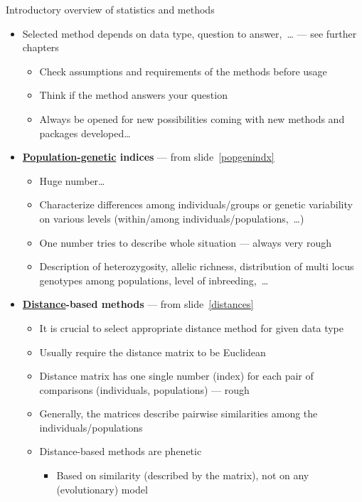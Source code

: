 \documentclass[compress, xelatex, 11pt, xcolor=svgnames, aspectratio=169,
	hyperref={
		bookmarks=true,
		unicode=true,
		colorlinks=true,
		pdftitle={Molecular data in R},
		plainpages=false,
		pdfauthor={Vojtech Zeisek},
		pdfsubject={Course about phylogeny and evolution in R},
		pdfcreator={XeLaTeX},
		pdfkeywords={R, evolution, phylogeny, molecular data},
		linkcolor=Crimson, %
		anchorcolor=Magenta, %
		citecolor=Magenta, %
		filecolor=Magenta, %
		menucolor=Magenta, %
		urlcolor=DodgerBlue, %
		},
	url={hyphens, lowtilde} %
	]{beamer}
\begin{document}
\begin{frame}[allowframebreaks]{Introductory overview of statistics and methods}
	\begin{itemize}
		\item \alert{Selected method depends on data type, question to answer,~\ldots}{ }--- see further chapters
		\begin{itemize}
			\item Check assumptions and requirements of the methods before usage
			\item Think if the method answers your question
			\item Always be opened for new possibilities coming with new methods and packages developed\ldots
		\end{itemize}
		\item \textbf{\href{https://en.wikipedia.org/wiki/Population_genetics}{Population-genetic} indices} --- from slide~\ref{popgenindx}
		\begin{itemize}
			\item Huge number\ldots
			\item Characterize differences among individuals/groups or genetic variability on various levels (within/among individuals/populations,~\ldots)
			\item One number tries to describe whole situation --- always very rough
			\item Description of heterozygosity, allelic richness, distribution of multi locus genotypes among populations, level of inbreeding,~\ldots
		\end{itemize}
		\item \textbf{\href{https://en.wikipedia.org/wiki/Genetic_distance}{Distance}-based methods} --- from slide~\ref{distances}
		\begin{itemize}
			\item \alert{It is crucial to select appropriate distance method for given data type}
			\item Usually require the distance matrix to be Euclidean
			\item Distance matrix has one single number (index) for each pair of comparisons (individuals, populations) --- rough
			\item Generally, the matrices describe pairwise similarities among the individuals/populations
			\item Distance-based methods are phenetic
			\begin{itemize}
				\item Based on similarity (described by the matrix), not on any (evolutionary) model

\end{itemize}
\end{itemize}
\end{itemize}
\end{frame}
\end{document}
